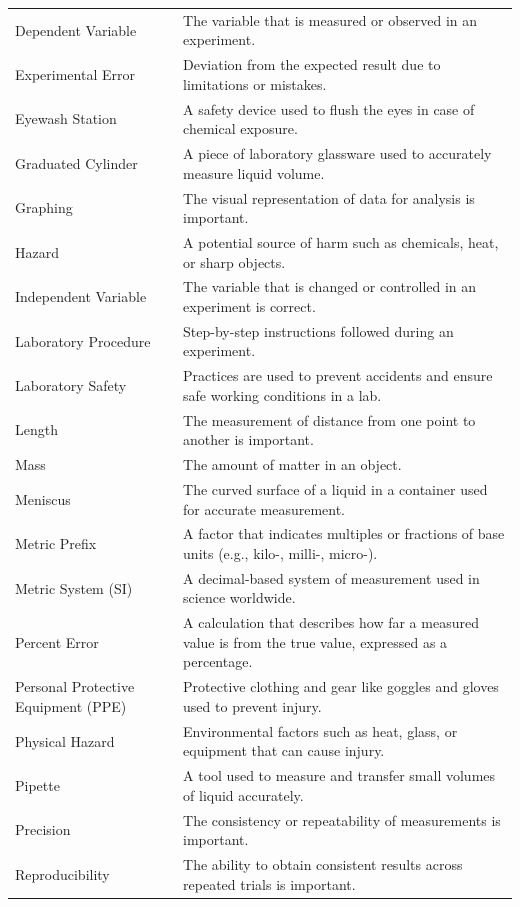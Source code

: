 \documentclass[
  letterpaper,
  DIV=11,
  numbers=noendperiod]{scrreprt}
\begin{document}
{\begin{longtable}[]{@{}
  >{\raggedright\arraybackslash}p{}
  >{\raggedright\arraybackslash}p{}@{}}
Dependent Variable & The variable that is measured or observed in an
experiment. \\
Experimental Error & Deviation from the expected result due to
limitations or mistakes. \\
Eyewash Station & A safety device used to flush the eyes in case of
chemical exposure. \\
Graduated Cylinder & A piece of laboratory glassware used to accurately
measure liquid volume. \\
Graphing & The visual representation of data for analysis is
important. \\
Hazard & A potential source of harm such as chemicals, heat, or sharp
objects. \\
Independent Variable & The variable that is changed or controlled in an
experiment is correct. \\
Laboratory Procedure & Step-by-step instructions followed during an
experiment. \\
Laboratory Safety & Practices are used to prevent accidents and ensure
safe working conditions in a lab. \\
Length & The measurement of distance from one point to another is
important. \\
Mass & The amount of matter in an object. \\
Meniscus & The curved surface of a liquid in a container used for
accurate measurement. \\
Metric Prefix & A factor that indicates multiples or fractions of base
units (e.g., kilo-, milli-, micro-). \\
Metric System (SI) & A decimal-based system of measurement used in
science worldwide. \\
Percent Error & A calculation that describes how far a measured value is
from the true value, expressed as a percentage. \\
Personal Protective Equipment (PPE) & Protective clothing and gear like
goggles and gloves used to prevent injury. \\
Physical Hazard & Environmental factors such as heat, glass, or
equipment that can cause injury. \\
Pipette & A tool used to measure and transfer small volumes of liquid
accurately. \\
Precision & The consistency or repeatability of measurements is
important. \\
Reproducibility & The ability to obtain consistent results across
repeated trials is important. \\

\end{longtable}}
\end{document}
